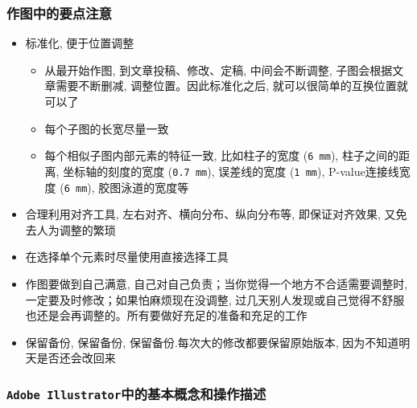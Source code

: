 \documentclass[]{article}
\providecommand{\tightlist}{%
  \setlength{\itemsep}{0pt}\setlength{\parskip}{0pt}}
\numberwithin{figure}{section}
\numberwithin{table}{section}
\theoremstyle{definition}
\theoremstyle{definition}
\theoremstyle{definition}
\theoremstyle{remark}
\begin{document}
\subsubsection{作图中的要点注意}

\begin{itemize}
\tightlist
\item
  标准化, 便于位置调整

  \begin{itemize}
  \tightlist
  \item
    从最开始作图, 到文章投稿、修改、定稿, 中间会不断调整,
    子图会根据文章需要不断删减, 调整位置。因此标准化之后,
    就可以很简单的互换位置就可以了
  \item
    每个子图的长宽尽量一致
  \item
    每个相似子图内部元素的特征一致, 比如柱子的宽度 (\texttt{6\ mm}),
    柱子之间的距离, 坐标轴的刻度的宽度 (\texttt{0.7\ mm}), 误差线的宽度
    (\texttt{1\ mm}), P-value连接线宽度 (\texttt{6\ mm}),
    胶图泳道的宽度等
  \end{itemize}
\item
  合理利用对齐工具, 左右对齐、横向分布、纵向分布等, 即保证对齐效果,
  又免去人为调整的繁琐
\item
  在选择单个元素时尽量使用直接选择工具
\item
  作图要做到自己满意, 自己对自己负责；当你觉得一个地方不合适需要调整时,
  一定要及时修改；如果怕麻烦现在没调整,
  过几天别人发现或自己觉得不舒服也还是会再调整的。所有要做好充足的准备和充足的工作
\item
  保留备份, 保留备份, 保留备份.每次大的修改都要保留原始版本,
  因为不知道明天是否还会改回来
\end{itemize}

\subsubsection{\texorpdfstring{\texttt{Adobe\ Illustrator}中的基本概念和操作描述}{Adobe Illustrator中的基本概念和操作描述}}\label{adobe-illustrator}
\end{document}
